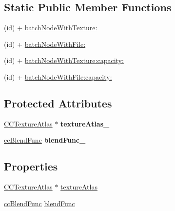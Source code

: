 \subsection*{Static Public Member Functions}
\begin{DoxyCompactItemize}
\item 
(id) + \hyperlink{interface_c_c_particle_batch_node_aeefc2b898bb14b18f5ac565b35d8833b}{batch\-Node\-With\-Texture\-:}
\item 
(id) + \hyperlink{interface_c_c_particle_batch_node_a2fa3a0c7a68d7bf9200466c39b33d341}{batch\-Node\-With\-File\-:}
\item 
(id) + \hyperlink{interface_c_c_particle_batch_node_a2bb7197d9933fcb02f0665ae7f65f463}{batch\-Node\-With\-Texture\-:capacity\-:}
\item 
(id) + \hyperlink{interface_c_c_particle_batch_node_af23cd623a3b8b06a2a01cc1c732be167}{batch\-Node\-With\-File\-:capacity\-:}
\end{DoxyCompactItemize}
\subsection*{Protected Attributes}
\begin{DoxyCompactItemize}
\item 
\hypertarget{interface_c_c_particle_batch_node_a568ebba44c978a92cdb618d00e4e7ce3}{\hyperlink{interface_c_c_texture_atlas}{C\-C\-Texture\-Atlas} $\ast$ {\bfseries texture\-Atlas\-\_\-}}\label{interface_c_c_particle_batch_node_a568ebba44c978a92cdb618d00e4e7ce3}

\item 
\hypertarget{interface_c_c_particle_batch_node_ae3ec9d8f9dd2f38d250e1bcb6afe7359}{\hyperlink{cc_types_8h_a8c19c6f67219ecc0a6e4740cc046008d}{cc\-Blend\-Func} {\bfseries blend\-Func\-\_\-}}\label{interface_c_c_particle_batch_node_ae3ec9d8f9dd2f38d250e1bcb6afe7359}

\end{DoxyCompactItemize}
\subsection*{Properties}
\begin{DoxyCompactItemize}
\item 
\hyperlink{interface_c_c_texture_atlas}{C\-C\-Texture\-Atlas} $\ast$ \hyperlink{interface_c_c_particle_batch_node_ac55a136114dcd1d3b7191448e0e0f70b}{texture\-Atlas}
\item 
\hyperlink{cc_types_8h_a8c19c6f67219ecc0a6e4740cc046008d}{cc\-Blend\-Func} \hyperlink{interface_c_c_particle_batch_node_a0b9e4c91f526e82daff2e1cb7f6d9988}{blend\-Func}
\end{DoxyCompactItemize}


